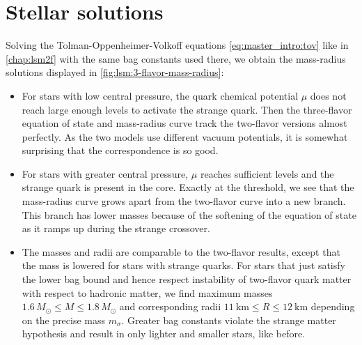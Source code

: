 \section{Stellar solutions}

Solving the Tolman-Oppenheimer-Volkoff equations \eqref{eq:master_intro:tov} like in \cref{chap:lsm2f} with the same bag constants used there,
we obtain the mass-radius solutions displayed in \cref{fig:lsm:3-flavor-mass-radius}:
\begin{itemize}
\item For stars with low central pressure,
      the quark chemical potential $\mu$ does not reach large enough levels to activate the strange quark.
      Then the three-flavor equation of state and mass-radius curve track the two-flavor versions almost perfectly.
      As the two models use different vacuum potentials, it is somewhat surprising that the correspondence is so good.
\item For stars with greater central pressure, $\mu$ reaches sufficient levels and the strange quark is present in the core.
      Exactly at the threshold, we see that the mass-radius curve grows apart from the two-flavor curve into a new branch.
      This branch has lower masses because of the softening of the equation of state as it ramps up during the strange crossover.
\item The masses and radii are comparable to the two-flavor results, except that the mass is lowered for stars with strange quarks.
      For stars that just satisfy the lower bag bound and hence respect instability of two-flavor quark matter with respect to hadronic matter,
      we find maximum masses $1.6 \, M_\odot\leq M \leq 1.8 \, M_\odot$ and corresponding radii $\SI{11}{\kilo\meter} \leq R \leq \SI{12}{\kilo\meter}$ depending on the precise mass $m_\sigma$.
      Greater bag constants violate the strange matter hypothesis and result in only lighter and smaller stars, like before.
\end{itemize}


